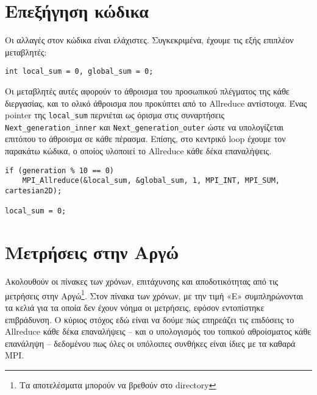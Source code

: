 \section{Επεξήγηση κώδικα}
Οι αλλαγές στον κώδικα είναι ελάχιστες. Συγκεκριμένα, έχουμε τις εξής επιπλέον μεταβλητές:

\begin{tcolorbox}
\begin{verbatim}
int local_sum = 0, global_sum = 0;
\end{verbatim}
\end{tcolorbox}

\begin{multicols}{2}
Οι μεταβλητές αυτές αφορούν το άθροισμα του προσωπικού πλέγματος της κάθε διεργασίας, και το ολικό άθροισμα που προκύπτει από το Allreduce αντίστοιχα. Ένας pointer της \texttt{local_sum} περνιέται ως όρισμα στις συναρτήσεις \texttt{Next_generation_inner} και \texttt{Next_generation_outer} ώστε να υπολογίζεται επιτόπου το άθροισμα σε κάθε πέρασμα. Επίσης, στο κεντρικό loop έχουμε τον παρακάτω κώδικα, ο οποίος υλοποιεί το Allreduce κάθε δέκα επαναλήψεις.
\end{multicols}

\begin{tcolorbox}
\begin{verbatim}
if (generation % 10 == 0)
    MPI_Allreduce(&local_sum, &global_sum, 1, MPI_INT, MPI_SUM, cartesian2D);
    
local_sum = 0;
\end{verbatim}
\end{tcolorbox}

\section{Μετρήσεις στην Αργώ}
\begin{multicols}{2}
Ακολουθούν οι πίνακες των χρόνων, επιτάχυνσης και αποδοτικότητας από τις μετρήσεις στην Αργώ\footnote{Τα αποτελέσματα μπορούν να βρεθούν στο directory }. Στον πίνακα των χρόνων, με την τιμή «Ε» συμπληρώνονται τα κελιά για τα οποία δεν έχουν νόημα οι μετρήσεις, εφόσον εντοπίστηκε επιβράδυνση. Ο κύριος στόχος εδώ είναι να δούμε πώς επηρεάζει τις επιδόσεις το Allreduce κάθε δέκα επαναλήψεις -- και ο υπολογισμός του τοπικού αθροίσματος κάθε επανάληψη -- δεδομένου πως όλες οι υπόλοιπες συνθήκες είναι ίδιες με τα καθαρά MPI.
\end{multicols}


